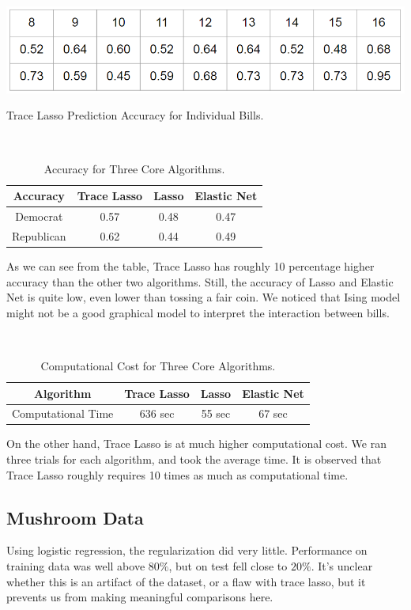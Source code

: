 \documentclass[11pt]{article}
\begin{document}
\begin{table}[h!]
\includegraphics[scale=0.5]{CVP2}
\centering
\caption{Trace Lasso Prediction Accuracy for Individual Bills.}
\end{table}


\
\begin{table}[ht]
\centering
\begin{tabular}{c c c c}
\hline
Accuracy & Trace Lasso & Lasso & Elastic Net \\
\hline
Democrat & 0.57 & 0.48 & 0.47 \\
Republican & 0.62 & 0.44 & 0.49 \\
\hline 
\end{tabular}
\caption{Accuracy for Three Core Algorithms.}
\label{table:nonlin} 
\end{table}

As we can see from the table, Trace Lasso has roughly 10 percentage higher accuracy than the other two algorithms. Still, the accuracy of Lasso and Elastic Net is quite low, even lower than tossing a fair coin. We noticed that Ising model might not be a good graphical model to interpret the interaction between bills.


\
\begin{table}[ht]
\centering
\begin{tabular}{c c c c}
\hline
Algorithm & Trace Lasso & Lasso & Elastic Net \\
\hline
Computational Time & 636 sec & 55 sec & 67 sec \\
\hline 
\end{tabular}
\caption{Computational Cost for Three Core Algorithms.}
\label{table:nonlin} 
\end{table}

On the other hand, Trace Lasso is at much higher computational cost. We ran three trials for each algorithm, and took the average time. It is observed that Trace Lasso roughly requires 10 times as much as computational time.

\subsection{Mushroom Data}
Using logistic regression, the regularization did very little. Performance on training data was well above $80\%$, but on test fell close to $20\%$.  It's unclear whether this is an artifact of the dataset, or a flaw with trace lasso, but it prevents us from making meaningful comparisons here.  
\end{document}
